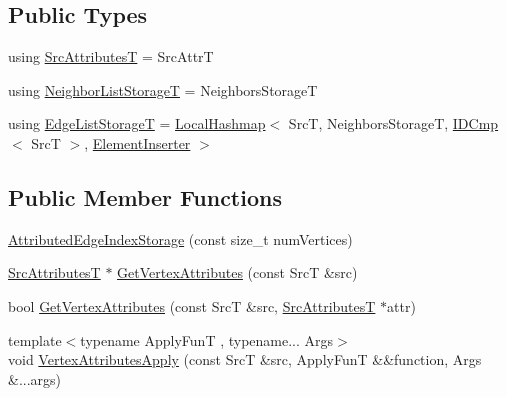 \subsection*{Public Types}
\begin{DoxyCompactItemize}
\item 
using \hyperlink{classshad_1_1AttributedEdgeIndexStorage_a9fcd3421b5de8fee1520bb001bae13d5}{Src\-Attributes\-T} = Src\-Attr\-T
\item 
using \hyperlink{classshad_1_1AttributedEdgeIndexStorage_a496b746cebb44b3675c14c22531f6bc5}{Neighbor\-List\-Storage\-T} = Neighbors\-Storage\-T
\item 
using \hyperlink{classshad_1_1AttributedEdgeIndexStorage_ae0e7b167b48bf7a96060a37ae0bb2feb}{Edge\-List\-Storage\-T} = \hyperlink{classshad_1_1LocalHashmap}{Local\-Hashmap}$<$ Src\-T, Neighbors\-Storage\-T, \hyperlink{classshad_1_1IDCmp}{I\-D\-Cmp}$<$ Src\-T $>$, \hyperlink{structshad_1_1AttributedEdgeIndexStorage_1_1ElementInserter}{Element\-Inserter} $>$
\end{DoxyCompactItemize}
\subsection*{Public Member Functions}
\begin{DoxyCompactItemize}
\item 
\hyperlink{classshad_1_1AttributedEdgeIndexStorage_a2206ee347d430507dc8b761932b111ed}{Attributed\-Edge\-Index\-Storage} (const size\-\_\-t num\-Vertices)
\item 
\hyperlink{classshad_1_1AttributedEdgeIndexStorage_a9fcd3421b5de8fee1520bb001bae13d5}{Src\-Attributes\-T} $\ast$ \hyperlink{classshad_1_1AttributedEdgeIndexStorage_ac1d30f94d9a356a98ac6111fa2259693}{Get\-Vertex\-Attributes} (const Src\-T \&src)
\item 
bool \hyperlink{classshad_1_1AttributedEdgeIndexStorage_a2a244b68a0a57f9c082e81360e317ed7}{Get\-Vertex\-Attributes} (const Src\-T \&src, \hyperlink{classshad_1_1AttributedEdgeIndexStorage_a9fcd3421b5de8fee1520bb001bae13d5}{Src\-Attributes\-T} $\ast$attr)
\item 
{\footnotesize template$<$typename Apply\-Fun\-T , typename... Args$>$ }\\void \hyperlink{classshad_1_1AttributedEdgeIndexStorage_a4e7361c272f54f2538e174fccfe25a5d}{Vertex\-Attributes\-Apply} (const Src\-T \&src, Apply\-Fun\-T \&\&function, Args \&...args)
\end{DoxyCompactItemize}
